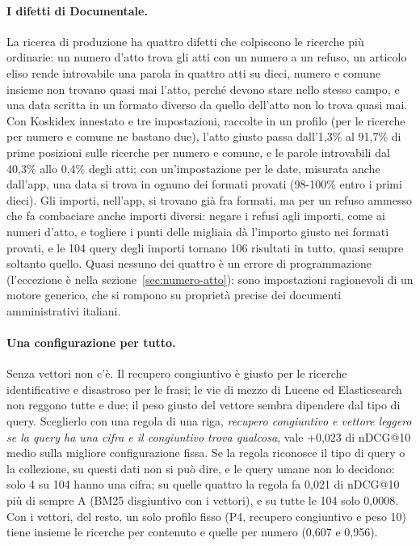 \paragraph{I difetti di Documentale.} La ricerca di produzione ha quattro difetti
che colpiscono le ricerche più ordinarie: un numero d'atto trova gli atti con un
numero a un refuso, un articolo eliso rende introvabile una parola in quattro atti
su dieci, numero e comune insieme non trovano quasi mai l'atto, perché devono
stare nello stesso campo, e una data scritta in un formato diverso da quello
dell'atto non lo trova quasi mai. Con Koskidex innestato e tre impostazioni, raccolte in un
profilo (per le ricerche per numero e comune ne bastano due), l'atto giusto passa dall'1,3\% al 91,7\% di prime posizioni sulle
ricerche per numero e comune, e le parole introvabili dal 40,3\% allo 0,4\% degli
atti; con un'impostazione per le date, misurata anche dall'app, una data si
trova in ognuno dei formati provati (98-100\% entro i primi dieci). Gli importi, nell'app, si trovano già fra formati,
ma per un refuso ammesso che fa combaciare anche importi diversi: negare i
refusi agli importi, come ai numeri d'atto, e togliere i punti delle migliaia
dà l'importo giusto nei formati provati, e le 104 query degli importi tornano 106 risultati in tutto, quasi sempre soltanto quello.
Quasi nessuno dei quattro è un errore di programmazione (l'eccezione è nella sezione~\ref{sec:numero-atto}): sono impostazioni
ragionevoli di un motore generico, che si rompono su proprietà precise dei
documenti amministrativi italiani.

\paragraph{Una configurazione per tutto.} Senza vettori non c'è. Il recupero congiuntivo è giusto
per le ricerche identificative e disastroso per le frasi; le vie di mezzo di
Lucene ed Elasticsearch non reggono tutte e due; il peso giusto del vettore
sembra dipendere dal tipo di query. Sceglierlo con una regola di una riga, \emph{recupero
congiuntivo e vettore leggero se la query ha una cifra e il congiuntivo trova
qualcosa}, vale +0,023 di nDCG@10 medio sulla migliore configurazione fissa. Se la
regola riconosce il tipo di query o la collezione, su questi dati non si può dire,
e le query umane non lo decidono: solo 4 su 104 hanno una cifra; su quelle quattro la regola fa 0,021 di
nDCG@10 più di sempre A (BM25 disgiuntivo con i vettori), e su tutte le 104 solo 0,0008. Con i vettori, del resto, un solo profilo fisso (P4,
recupero congiuntivo e peso 10) tiene insieme le ricerche per contenuto e quelle
per numero (0,607 e 0,956).

